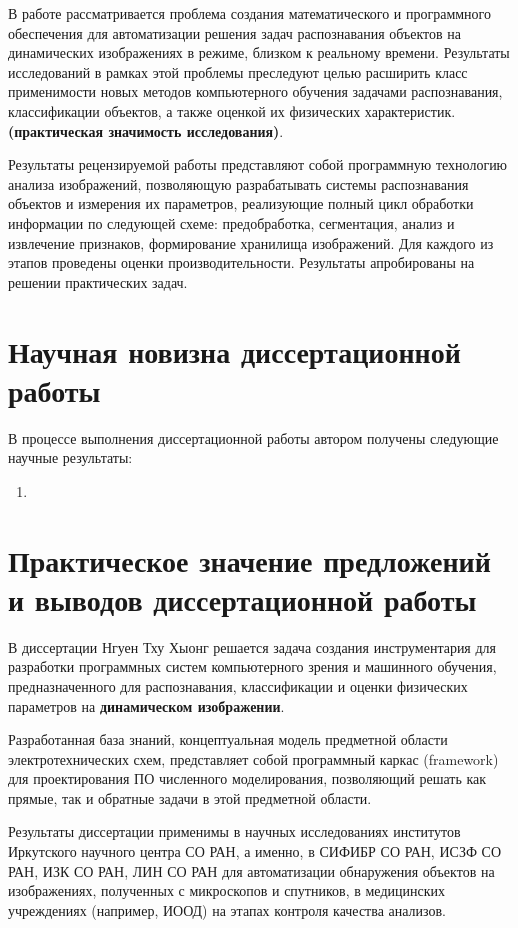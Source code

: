 \documentclass[14pt]{extarticle}
\begin{document}
В работе рассматривается проблема создания математического и программного обеспечения для автоматизации решения задач распознавания объектов на динамических изображениях в режиме, близком к реальному времени.  Результаты исследований в рамках этой проблемы преследуют целью расширить класс применимости новых методов компьютерного обучения задачами распознавания, классификации объектов, а также оценкой их физических характеристик.  \textbf{(практическая значимость исследования)}.

Результаты рецензируемой работы представляют собой программную технологию анализа изображений, позволяющую разрабатывать системы распознавания объектов и измерения их параметров, реализующие полный цикл обработки информации по следующей схеме: предобработка, сегментация, анализ и извлечение признаков, формирование хранилища изображений.  Для каждого из этапов проведены оценки производительности.  Результаты апробированы на решении практических задач.

\section{Научная новизна диссертационной работы}
\label{sec:sci-new}

В процессе выполнения диссертационной работы автором получены следующие научные результаты:
\begin{enumerate}
\item

\end{enumerate}

\section{Практическое значение предложений и выводов диссертационной работы}
\label{sec:prec-val}

В диссертации Нгуен Тху Хыонг решается задача создания инструментария для разработки программных систем компьютерного зрения и машинного обучения, предназначенного для распознавания, классификации и оценки физических параметров на \textbf{динамическом изображении}.

Разработанная база знаний, концептуальная модель предметной области электротехнических схем, представляет собой программный каркас (framework) для проектирования ПО численного моделирования, позволяющий решать как прямые, так и обратные задачи в этой предметной области.

Результаты диссертации применимы в научных исследованиях институтов Иркутского научного центра СО РАН, а именно, в СИФИБР СО РАН, ИСЗФ СО РАН, ИЗК СО РАН, ЛИН СО РАН для автоматизации обнаружения объектов на изображениях, полученных с микроскопов и спутников, в медицинских учреждениях (например, ИООД) на этапах контроля качества анализов.
\end{document}
